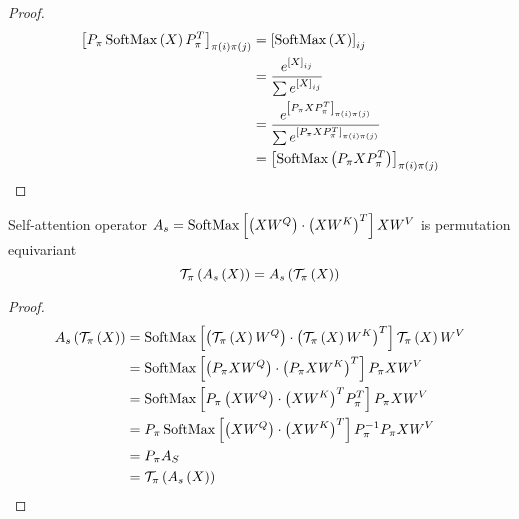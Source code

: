 \begin{proof}
    \begin{align*}
        \left[P_{\pi}\operatorname{SoftMax}\left(X\right)P_{\pi}^T\right]_{\pi(i)\pi(j)} & = \left[\operatorname{SoftMax}\left(X\right)\right]_{ij}                                                                         \\
                                                                           & = \frac{e^{\left[X\right]_{ij}}}{\sum e^{\left[X\right]_{ij}}}                                                     \\
                                                                           & = \frac{e^{\left[P_{\pi}XP_{\pi}^T\right]_{\pi(i)\pi(j)}}}{\sum e^{\left[P_{\pi}XP_{\pi}^T\right]_{\pi(i)\pi(j)}}} \\
                                                                           & = \left[\operatorname{SoftMax}\left(P_{\pi}XP_{\pi}^T\right)\right]_{\pi(i)\pi(j)}
    \end{align*}
\end{proof}

\begin{theorem}
    Self-attention operator \(A_s = \operatorname{SoftMax}\left[\left(XW^Q\right)\cdot\left(XW^K\right)^T \right]XW^V\) is permutation equivariant
    \[\mathcal{T}_{\pi}\left(A_s\left(X\right)\right) = A_s\left(\mathcal{T}_{\pi}\left(X\right)\right)\]
\end{theorem}

\begin{proof}
    \begin{align*}
        A_s\left(\mathcal{T}_{\pi}\left(X\right)\right) & = \operatorname{SoftMax}\left[ \left( \mathcal{T}_{\pi}\left(X\right)W^Q\right) \cdot \left(\mathcal{T}_{\pi}\left(X\right)W^K\right)^T \right] \mathcal{T}_{\pi}\left(X\right)W^V \\
                                             & = \operatorname{SoftMax}\left[ \left(P_{\pi}XW^Q\right)\cdot\left(P_{\pi}XW^K\right)^T  \right]P_{\pi}XW^V                                        \\
                                             & = \operatorname{SoftMax}\left[ P_{\pi}\left(XW^Q\right)\cdot{\left(XW^K\right)}^T P_{\pi}^T  \right]P_{\pi}XW^V                                   \\
                                             & = P_{\pi}\operatorname{SoftMax}\left[ \left(XW^Q\right)\cdot{\left(XW^K\right)}^T\right]P_{\pi}^{-1}P_{\pi}XW^V                                   \\
                                             & = P_{\pi}A_S                                                                                                                        \\
                                             & = \mathcal{T}_{\pi}\left(A_s\left(X\right)\right)
    \end{align*}
\end{proof}
